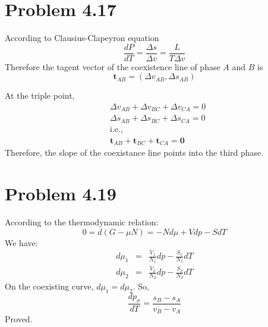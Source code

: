 \documentclass{article}
\begin{document}
\section*{Problem 4.17} %
\label{sec:problem_4_17}
	According to Clausius-Clapeyron equation
	\begin{equation}
		\frac{dP}{dT}=\frac{\Delta s}{\Delta v} = \frac{L}{T \Delta v}
	\end{equation}
	Therefore the tagent vector of the coexistence line of phase $A$ and $B$ is
	\begin{equation}
		\bm t_{AB} = ( \Delta v_{AB} , \Delta s_{AB} )
	\end{equation}

	At the triple point,
	\begin{align*}
		&\Delta v_{AB}+\Delta v_{BC}+\Delta v_{CA}=0\\
		&\Delta s_{AB}+\Delta s_{BC}+\Delta s_{CA}=0\\
		&\text{i.e.,}\\
		&\bm t_{AB}+\bm t_{BC}+\bm t_{CA}=\bm 0
	\end{align*}
	Therefore, the slope of the coexistance line points into the third phase.


\section*{Problem 4.19}
According to the thermodynamic relation:
$$
0=d(G-\mu N)=-Nd\mu +Vdp-SdT  
$$
We have:
\begin{eqnarray*}
d\mu_1 &=& \frac{V_1}{N_1}dp-\frac{S_1}{N_1}dT  \\
d\mu_2 &=& \frac{V_2}{N_2}dp-\frac{S_2}{N_2}dT 
\end{eqnarray*}
On the coexisting curve, $d\mu_1=d\mu_2$. So,
$$\frac{dp_{\sigma}}{dT}=\frac{s_B-s_A}{v_B-v_A}$$
Proved.
\end{document}
